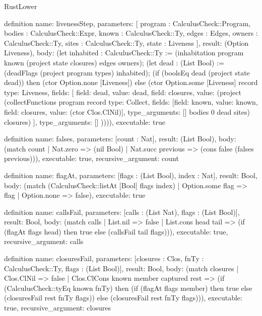 \begin{lexlean}{RustLower}
\begin{semanticmodule}
definition{
  name: livenessStep,
  parameters: [
    program : CalculusCheck::Program,
    bodies : CalculusCheck::Expr,
    known : CalculusCheck::Ty,
    edges : Edges,
    owners : CalculusCheck::Ty,
    sites : CalculusCheck::Ty,
    state : Liveness
  ],
  result: (Option Liveness),
  body: (let inhabited : CalculusCheck::Ty := (inhabitation program known (project state closures) edges owners); (let dead : (List Bool) := (deadFlags (project program types) inhabited); (if (boolsEq dead (project state dead)) then (ctor Option.none [Liveness]) else (ctor Option.some [Liveness] record{
    type: Liveness,
    fields: [
      {field: dead, value: dead},
      {
        field: closures,
        value: (project (collectFunctions program record{
          type: Collect,
          fields: [{field: known, value: known}, {field: closures, value: (ctor Clos.ClNil)}],
          type_arguments: []
        } bodies 0 dead sites) closures)
      }
    ],
    type_arguments: []
  })))),
  executable: true
}

definition{
  name: falses,
  parameters: [count : Nat],
  result: (List Bool),
  body: (match count
    | Nat.zero => (nil Bool)
    | Nat.succ previous => (cons false (falses previous))),
  executable: true,
  recursive_argument: count
}

definition{
  name: flagAt,
  parameters: [flags : (List Bool), index : Nat],
  result: Bool,
  body: (match (CalculusCheck::listAt [Bool] flags index)
    | Option.some flag => flag
    | Option.none => false),
  executable: true
}

definition{
  name: callsFail,
  parameters: [calls : (List Nat), flags : (List Bool)],
  result: Bool,
  body: (match calls
    | List.nil => false
    | List.cons head tail => (if (flagAt flags head) then true else (callsFail tail flags))),
  executable: true,
  recursive_argument: calls
}

definition{
  name: closuresFail,
  parameters: [closures : Clos, fnTy : CalculusCheck::Ty, flags : (List Bool)],
  result: Bool,
  body: (match closures
    | Clos.ClNil => false
    | Clos.ClCons known member captured rest => (if (CalculusCheck::tyEq known fnTy) then (if (flagAt flags member) then true else (closuresFail rest fnTy flags)) else (closuresFail rest fnTy flags))),
  executable: true,
  recursive_argument: closures
}


\end{semanticmodule}
\end{lexlean}

